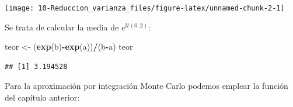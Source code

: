 \documentclass[
]{book}
\newenvironment{Shaded}{\begin{snugshade}}{\end{snugshade}}
\newcommand{\KeywordTok}[1]{\textcolor[rgb]{0.13,0.29,0.53}{\textbf{#1}}}
\newcommand{\NormalTok}[1]{#1}
\newcommand{\OperatorTok}[1]{\textcolor[rgb]{0.81,0.36,0.00}{\textbf{#1}}}
\newcommand{\StringTok}[1]{\textcolor[rgb]{0.31,0.60,0.02}{#1}}
\theoremstyle{break}
\theoremstyle{definition}
\theoremstyle{definition}
\theoremstyle{definition}
\theoremstyle{remark}
\begin{document}
\begin{center}\texttt{[image: 10-Reduccion\_varianza\_files/figure-latex/unnamed-chunk-2-1]} \end{center}

Se trata de calcular la media de \(e^{\mathcal{U}(0,2)}\):

\begin{Shaded}
\begin{Highlighting}[]
\NormalTok{teor <-}\StringTok{ }\NormalTok{(}\KeywordTok{exp}\NormalTok{(b)}\OperatorTok{-}\KeywordTok{exp}\NormalTok{(a))}\OperatorTok{/}\NormalTok{(b}\OperatorTok{-}\NormalTok{a)}
\NormalTok{teor}
\end{Highlighting}
\end{Shaded}

\begin{verbatim}
## [1] 3.194528
\end{verbatim}

Para la aproximación por integración Monte Carlo podemos emplear la función del capítulo anterior:
\end{document}
